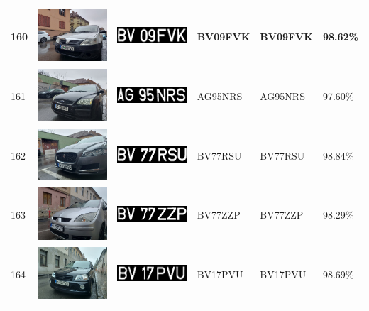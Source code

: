 \documentclass[a4paper,12pt]{report}
\begin{document}
\begin{longtable}{| m{0.6cm} | m{3cm} | m{3cm} | m{1.8cm} | m{1.8cm} | m{1.8cm} |}
        160 & \includegraphics[width=3cm,keepaspectratio]{dataset/97_d1.jpg} & \includegraphics[width=3cm,keepaspectratio]{segmentari/160.jpg} & BV09FVK & BV09FVK & 98.62\% \\ \hline
        161 & \includegraphics[width=3cm,keepaspectratio]{dataset/98_d1.jpg} & \includegraphics[width=3cm,keepaspectratio]{segmentari/161.jpg} & AG95NRS & AG95NRS & 97.60\% \\ \hline
        162 & \includegraphics[width=3cm,keepaspectratio]{dataset/99_d1.jpg} & \includegraphics[width=3cm,keepaspectratio]{segmentari/162.jpg} & BV77RSU & BV77RSU & 98.84\% \\ \hline
        163 & \includegraphics[width=3cm,keepaspectratio]{dataset/100_d1.jpg} & \includegraphics[width=3cm,keepaspectratio]{segmentari/163.jpg} & BV77ZZP & BV77ZZP & 98.29\% \\ \hline
        164 & \includegraphics[width=3cm,keepaspectratio]{dataset/101_d1.jpg} & \includegraphics[width=3cm,keepaspectratio]{segmentari/164.jpg} & BV17PVU & BV17PVU & 98.69\% \\ \hline

\end{longtable}
\end{document}
